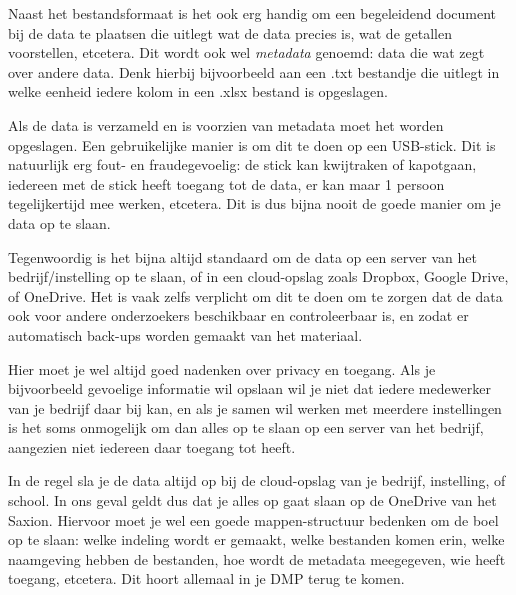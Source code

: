 Naast het bestandsformaat is het ook erg handig om een begeleidend document bij de data te plaatsen die uitlegt wat de data precies is, wat de getallen voorstellen, etcetera. Dit wordt ook wel \textit{metadata} genoemd: data die wat zegt over andere data. Denk hierbij bijvoorbeeld aan een .txt bestandje die uitlegt in welke eenheid iedere kolom in een .xlsx bestand is opgeslagen.

Als de data is verzameld en is voorzien van metadata moet het worden opgeslagen. Een gebruikelijke manier is om dit te doen op een USB-stick. Dit is natuurlijk erg fout- en fraudegevoelig: de stick kan kwijtraken of kapotgaan, iedereen met de stick heeft toegang tot de data, er kan maar 1 persoon tegelijkertijd mee werken, etcetera. Dit is dus bijna nooit de goede manier om je data op te slaan.

Tegenwoordig is het bijna altijd standaard om de data op een server van het bedrijf/instelling op te slaan, of in een cloud-opslag zoals Dropbox, Google Drive, of OneDrive. Het is vaak zelfs verplicht om dit te doen om te zorgen dat de data ook voor andere onderzoekers beschikbaar en controleerbaar is, en zodat er automatisch back-ups worden gemaakt van het materiaal.

Hier moet je wel altijd goed nadenken over privacy en toegang. Als je bijvoorbeeld gevoelige informatie wil opslaan wil je niet dat iedere medewerker van je bedrijf daar bij kan, en als je samen wil werken met meerdere instellingen is het soms onmogelijk om dan alles op te slaan op een server van het bedrijf, aangezien niet iedereen daar toegang tot heeft.

In de regel sla je de data altijd op bij de cloud-opslag van je bedrijf, instelling, of school. In ons geval geldt dus dat je alles op gaat slaan op de OneDrive van het Saxion. Hiervoor moet je wel een goede mappen-structuur bedenken om de boel op te slaan: welke indeling wordt er gemaakt, welke bestanden komen erin, welke naamgeving hebben de bestanden, hoe wordt de metadata meegegeven, wie heeft toegang, etcetera. Dit hoort allemaal in je DMP terug te komen. 

